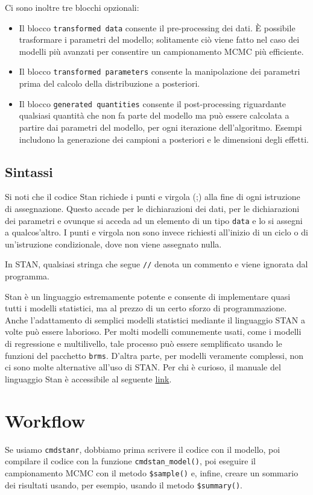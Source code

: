 \documentclass[
]{memoir}
\begin{document}
Ci sono inoltre tre blocchi opzionali:

\begin{itemize}
\item
  Il blocco \texttt{transformed\ data} consente il pre-processing dei dati. È possibile trasformare i parametri del modello; solitamente ciò viene fatto nel caso dei modelli più avanzati per consentire un campionamento MCMC più efficiente.
\item
  Il blocco \texttt{transformed\ parameters} consente la manipolazione dei parametri prima del calcolo della distribuzione a posteriori.
\item
  Il blocco \texttt{generated\ quantities} consente il post-processing riguardante qualsiasi quantità che non fa parte del modello ma può essere calcolata a partire dai parametri del modello, per ogni iterazione dell'algoritmo. Esempi includono la generazione dei campioni a posteriori e le dimensioni degli effetti.
\end{itemize}

\hypertarget{sintassi}{%
\subsection{Sintassi}\label{sintassi}}

Si noti che il codice Stan richiede i punti e virgola (;) alla fine di ogni istruzione di assegnazione. Questo accade per le dichiarazioni dei dati, per le dichiarazioni dei parametri e ovunque si acceda ad un elemento di un tipo \texttt{data} e lo si assegni a qualcos'altro. I punti e virgola non sono invece richiesti all'inizio di un ciclo o di un'istruzione condizionale, dove non viene assegnato nulla.

In STAN, qualsiasi stringa che segue \texttt{//} denota un commento e viene ignorata dal programma.

Stan è un linguaggio estremamente potente e consente di implementare quasi tutti i modelli statistici, ma al prezzo di un certo sforzo di programmazione. Anche l'adattamento di semplici modelli statistici mediante il linguaggio STAN a volte può essere laborioso. Per molti modelli comunemente usati, come i modelli di regressione e multilivello, tale processo può essere semplificato usando le funzioni del pacchetto \texttt{brms}. D'altra parte, per modelli veramente complessi, non ci sono molte alternative all'uso di STAN. Per chi è curioso, il manuale del linguaggio Stan è accessibile al seguente \href{https://mc-stan.org/docs/2_27/stan-users-guide/index.html}{link}.

\hypertarget{workflow}{%
\section{Workflow}\label{workflow}}

Se usiamo \texttt{cmdstanr}, dobbiamo prima scrivere il codice con il modello, poi compilare il codice con la funzione \texttt{cmdstan\_model()}, poi eseguire il campionamento MCMC con il metodo \texttt{\$sample()} e, infine, creare un sommario dei risultati usando, per esempio, usando il metodo \texttt{\$summary()}.

  
\end{document}

